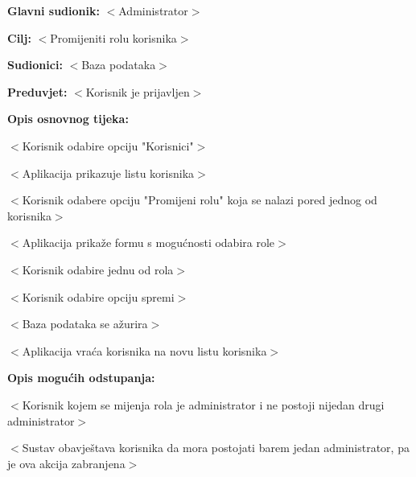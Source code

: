 					\noindent {}
					\begin{packed_item}

						\item \textbf{Glavni sudionik: }$<$Administrator$>$
						\item  \textbf{Cilj:} $<$Promijeniti rolu korisnika$>$
						\item  \textbf{Sudionici:} $<$Baza podataka$>$
						\item  \textbf{Preduvjet:} $<$Korisnik je prijavljen$>$
						\item  \textbf{Opis osnovnog tijeka:}

						\item[] \begin{packed_enum}

							\item $<$Korisnik odabire opciju "Korisnici"$>$
							\item $<$Aplikacija prikazuje listu korisnika$>$
							\item $<$Korisnik odabere opciju "Promijeni rolu" koja se nalazi pored jednog od korisnika$>$
							\item $<$Aplikacija prikaže formu s mogućnosti odabira role$>$
							\item $<$Korisnik odabire jednu od rola$>$
							\item $<$Korisnik odabire opciju spremi$>$
							\item $<$Baza podataka se ažurira$>$
							\item $<$Aplikacija vraća korisnika na novu listu korisnika$>$

						\end{packed_enum}

						\item  \textbf{Opis mogućih odstupanja:}

						\item[] \begin{packed_item}

							\item[3.a] $<$Korisnik kojem se mijenja rola je administrator i ne postoji nijedan
							drugi administrator$>$
							\item[] \begin{packed_enum}

								\item $<$Sustav obavještava korisnika da mora postojati
								barem jedan administrator, pa je ova akcija zabranjena$>$

							\end{packed_enum}

						\end{packed_item}
					\end{packed_item}

